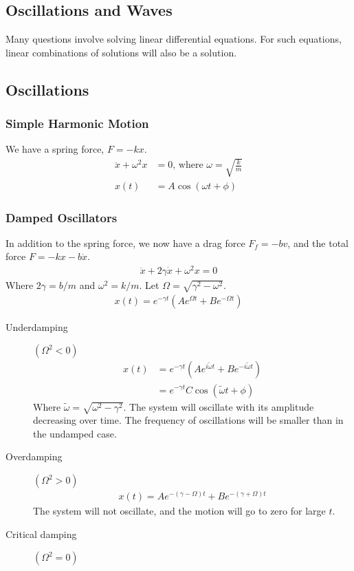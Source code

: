 \documentclass[11pt]{article}
\begin{document}
\begin{multicols*}{3}
\section{Oscillations and Waves}
Many questions involve solving linear differential equations. For such equations, linear combinations of solutions will also be a solution.
\subsection{Oscillations}
\subsubsection{Simple Harmonic Motion}
We have a spring force, $F=-kx$.
\begin{align*}
\ddot{x}+\omega^2x&=0 \text{, where }\omega=\sqrt{\frac{k}{m}}\\
x(t)&=A \cos(\omega t+\phi)
\end{align*}
\subsubsection{Damped Oscillators}
In addition to the spring force, we now have a drag force $F_f=-bv$, and the total force $F=-kx-b\dot{x}$.
\begin{align*}
\ddot{x} + 2\gamma\dot{x}+\omega^2x=0
\end{align*}
Where $2\gamma=b/m$ and $\omega^2=k/m$. Let $\Omega = \sqrt{\gamma^2-\omega^2}$.
\begin{align*}
x(t)=e^{-\gamma t}(Ae^{\Omega t}+Be^{-\Omega t})
\end{align*}
\begin{description}
\item [Underdamping] $(\Omega^2<0)$
\begin{align*}
x(t)&=e^{-\gamma t}(Ae^{i\tilde{\omega}t}+Be^{-i\tilde{\omega}t})\\
&=e^{-\gamma t}C\cos(\tilde{\omega}t + \phi)
\end{align*}
Where $\tilde{\omega}=\sqrt{\omega^2-\gamma^2}$. The system will oscillate with its amplitude decreasing over time. The frequency of oscillations will be smaller than in the undamped case.
\item[Overdamping] $(\Omega^2>0)$
\begin{align*}
x(t)=Ae^{-(\gamma-\Omega)t}+Be^{-(\gamma+\Omega)t}
\end{align*}
The system will not oscillate, and the motion will go to zero for large $t$.
\item[Critical damping] $(\Omega^2=0)$


\end{description}
\end{multicols*}
\end{document}
